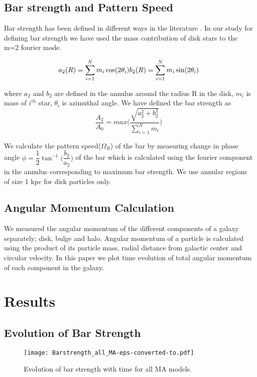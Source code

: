 \documentclass[a4paper,fleqn,usenatbib,useAMS]{mnras}
\begin{document}
\subsection{Bar strength and Pattern Speed}
Bar strength has been defined in different ways in the literature   \citep{13a,15a1}. In our study for defining  bar strength we have used the mass contribution of disk stars to the m=2 fourier mode.

\begin{equation}
a_2(R)=\sum_{i=1}^{N}  m_i \cos(2\theta_i)\\
b_2(R)=\sum_{i=1}^{N} m_i \sin(2 \theta_i)
\end{equation}

where $a_2$ and $b_2$ are defined in the annulus around the radius R in the disk, $m_i$ is mass of $i^{th}$ star, $\theta_i$ is azimuthal angle. We have defined the bar strength as 
\begin{equation}
\dfrac{A_2}{A_0}=max \Bigg(\dfrac{\sqrt{a_2 ^2 +b_2 ^2}}{\sum_{i=1}^{N} m_i}\Bigg) 
\end{equation}

We calculate the pattern speed($\Omega_B$) of the bar by measuring change in phase angle  $\phi=\dfrac{1}{2}\tan^{-1}\bigg(\dfrac{b_2}{a_2}\bigg)$ of the bar which is calculated using the fourier component in the annulus corresponding to maximum bar strength. We use annular regions of size 1 kpc for disk particles only. 

\subsection{Angular Momentum Calculation}
We measured the  angular momentum of the different components of a galaxy separately; disk, bulge and halo. Angular momentum of a particle is calculated using the product of its particle mass, radial distance from galactic center and circular velocity. In this paper we plot time evolution of total angular momentum of each component in the galaxy.  


\section{Results} \label{Results}


\subsection{Evolution of Bar Strength}
\begin{figure}
\texttt{[image: Barstrength\_all\_MA-eps-converted-to.pdf]}
\caption{Evolution of bar strength with time for all MA models.}
\label{figure:BS_MA}
\end{figure}
\end{document}
